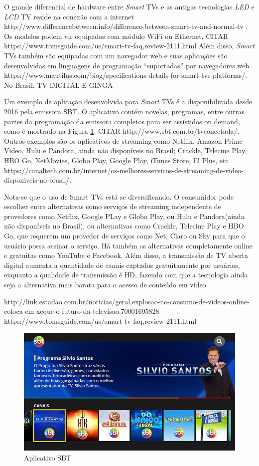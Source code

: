 O grande diferencial de hardware entre \emph{Smart} TVs e as antigas tecnologias \emph{LED} e \emph{LCD} TV reside na conexão com a internet http://www.differencebetween.info/difference-between-smart-tv-and-normal-tv . Os modelos podem vir equipados com módulo WiFi ou Ethernet, CITAR https://www.tomsguide.com/us/smart-tv-faq,review-2111.html
Além disso, \emph{Smart} TVs também são equipadas com um navegador web e suas aplicações são desenvolvidas em linguagens de programação ``suportadas'' por navegadores web https://www.mautilus.com/blog/specifications-details-for-smart-tvs-platforms/. No Brasil, TV DIGITAL E GINGA

Um exemplo de aplicação desenvolvida para \emph{Smart} TVs é a disponibilizada desde 2016 pela emissora SBT. O aplicativo contém novelas, programas, entre outras partes da programação da emissora completos para ser assistidos on demand, como é mostrado na Figura \ref{fig:sbt_app}. CITAR http://www.sbt.com.br/tvconectada/. Outros exemplos são os aplicativos de streaming como Netflix, Amazon Prime Video, Hulu e Pandora, ainda não disponíveis no Brasil; Crackle, Telecine Play, HBO Go, NetMovies, Globo Play, Google Play, iTunes Store, E! Plus, etc https://canaltech.com.br/internet/os-melhores-servicos-de-streaming-de-video-disponiveis-no-brasil/.

Nota-se que o uso de Smart TVs está se diversificando. O consumidor pode escolher entre alternativas como serviços de streaming independente de provedores como Netflix, Google PLay e Globo Play, ou Hulu e Pandora(ainda não disponíveis no Brasil), ou alternativas como Crackle, Telecine Play e HBO Go, que requerem um provedor de serviços como Net, Claro ou Sky para que o usuário possa assinar o serviço. Há também as alternativas completamente online e gratuitas como YouTube e Facebook. Além disso, a transmissão de TV aberta digital aumenta a quantidade de canais captados gratuitamente por usuários, enquanto a qualidade de transmissão é HD, fazendo com que a tecnologia ainda seja a alternativa mais barata para o acesso de conteúdo em vídeo.

http://link.estadao.com.br/noticias/geral,explosao-no-consumo-de-videos-online-coloca-em-xeque-o-futuro-da-televisao,70001695828
https://www.tomsguide.com/us/smart-tv-faq,review-2111.html

\begin{figure}
	\includegraphics[width=\textwidth]{img/sbt_app.jpg}
	\caption{Aplicativo SBT}
	\label{fig:sbt_app}
\end{figure}

